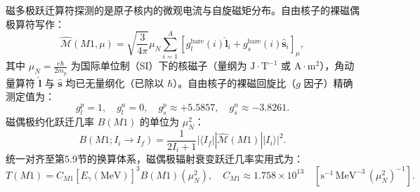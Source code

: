 磁多极跃迁算符探测的是原子核内的微观电流与自旋磁矩分布。自由核子的裸磁偶极算符写作：
\begin{equation}\label{eq:2-7-M1-bare}
\hat{\mathcal{M}}(M1, \mu) = \sqrt{\frac{3}{4\pi}} \mu_N \sum_{i=1}^A \left[ g_l^{\mathrm{bare}}(i) \hat{\mathbf{l}}_i + g_s^{\mathrm{bare}}(i) \hat{\mathbf{s}}_i \right]_\mu,
\end{equation}
其中 $\mu_N = \frac{e\hbar}{2 m_p}$ 为国际单位制（SI）下的核磁子（量纲为 $\mathrm{J}\cdot\mathrm{T}^{-1}$ 或 $\mathrm{A}\cdot\mathrm{m}^2$），角动量算符 $\hat{\mathbf{l}}$ 与 $\hat{\mathbf{s}}$ 均已无量纲化（已除以 $\hbar$）。自由核子的裸磁回旋比（$g$ 因子）精确测定值为：
\begin{equation}\label{eq:2-7-free-gfactors}
g_l^p = 1, \quad g_l^n = 0, \quad g_s^p \approx +5.5857, \quad g_s^n \approx -3.8261.
\end{equation}
磁偶极约化跃迁几率 $B(M1)$ 的单位为 $\mu_N^2$：
\begin{equation}\label{eq:2-7-BM1-def}
B(M1; I_i \to I_f) = \frac{1}{2I_i + 1} |\langle I_f || \hat{\mathcal{M}}(M1) || I_i \rangle|^2.
\end{equation}
统一对齐至第5.9节的换算体系，磁偶极辐射衰变跃迁几率实用式为：
\begin{equation}\label{eq:2-7-TM1-rate}
T(M1) = C_{M1} [E_\gamma(\mathrm{MeV})]^3 B(M1)(\mu_N^2), \quad C_{M1} \approx 1.758 \times 10^{13} \quad [\mathrm{s}^{-1}\,\mathrm{MeV}^{-3}\,(\mu_N^2)^{-1}].
\end{equation}

